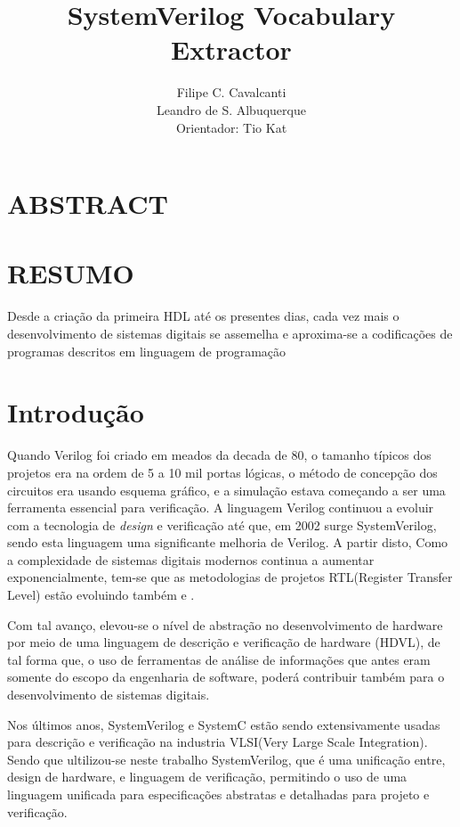 \documentclass[12pt, twocolumn, a4paper]{article}
\begin{document}
	\title{SystemVerilog Vocabulary Extractor}
	\author{Filipe C. Cavalcanti\\ Leandro de S. Albuquerque\\
	Orientador: Tio Kat}
	\maketitle
	
	\section{ABSTRACT}
	
	\section{RESUMO}
	\quad Desde a criação da primeira HDL até os presentes dias, cada vez mais o desenvolvimento de sistemas digitais se assemelha e aproxima-se a codificações de programas descritos em linguagem de programação  
	
	\section{Introdução}
\quad Quando Verilog foi criado em meados da decada de 80, o tamanho típicos dos projetos era na ordem de 5 a 10 mil portas lógicas, o método de concepção dos circuitos era usando esquema gráfico, e a simulação estava começando a ser uma ferramenta essencial para verificação\cite{sutherland2006}. A linguagem Verilog continuou a evoluir com a tecnologia de \textit{design} e verificação até que, em 2002 surge SystemVerilog, sendo esta linguagem uma significante melhoria de Verilog\cite{sutherland2006}. A partir disto, Como a complexidade de sistemas digitais modernos continua a aumentar exponencialmente, tem-se que as metodologias de projetos RTL(Register Transfer Level) estão evoluindo também\cite{Marc-Andre} e \cite{Hahanov2008}.

Com tal avanço, elevou-se o nível de abstração no desenvolvimento de hardware por meio de uma linguagem de descrição e verificação de hardware (HDVL), de tal forma que, o uso de ferramentas de análise de informações que antes eram somente do escopo da engenharia de software, poderá contribuir também para o desenvolvimento de sistemas digitais.

Nos últimos anos, SystemVerilog e SystemC estão sendo extensivamente usadas para descrição e verificação na industria VLSI(Very Large Scale Integration)\cite{Kumar2014}. Sendo que ultilizou-se neste trabalho SystemVerilog, que é uma unificação entre, design de hardware, e linguagem de verificação\cite{IEEEComputerSociety2013}, permitindo o uso de uma linguagem unificada para especificações abstratas e detalhadas para projeto e verificação.
\end{document}
